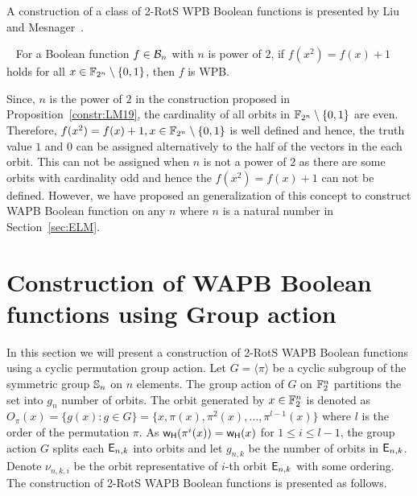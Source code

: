 \documentclass{llncs}
\begin{document}
A construction of a class of 2-RotS WPB Boolean functions is presented by Liu and Mesnager~\cite{DCC:LiuMes19}.
\begin{proposition} \cite{DCC:LiuMes19}~\label{constr:LM19} For a Boolean function $f \in \mathcal{B}_n$ with $n$ is power of $2$, if $f(x^2)=f(x)+1$ holds for all $x \in \mathbb{F}_{2^n} \setminus \{0,1\}$, then $f$ is WPB.  
\end{proposition}
Since, $n$ is the power of $2$ in the construction proposed in Proposition~\ref{constr:LM19}, the cardinality of all orbits in $\mathbb{F}_{2^n} \setminus \{0,1\}$ are even. Therefore, $f(x^2)=f(x)+1, x \in \mathbb{F}_{2^n} \setminus \{0,1\}$ is well defined and hence, the truth value $1$ and $0$ can be assigned alternatively to the half of the vectors in the each orbit. This can not be assigned when $n$ is not a power of $2$ as there are some orbits with cardinality odd and hence the $f(x^2) = f(x)+1$ can not be defined. However, we have proposed an generalization of this concept to construct WAPB Boolean function on any $n$ where $n$ is a natural number in Section~\ref{sec:ELM}. 

\section{Construction of WAPB Boolean functions using Group action}\label{sec:GA}
In this section we will present a construction of 2-RotS WAPB Boolean functions using a cyclic permutation group action. Let $G = \langle \pi \rangle$ be a cyclic subgroup of the symmetric group $\mathbb{S}_n$ on $n$ elements. The group action of $G$ on $\mathbb{F}_2^n$ partitions the set into $g_n$ number of orbits. The orbit generated by $x \in \mathbb{F}_2^n$ is denoted as $O_\pi(x) = \{g(x) : g \in G\} = \{x , \pi(x), \pi^2 (x),\ldots ,\pi^{l-1}(x)\}$ where $l$ is the order of the permutation $\pi$. As $\mathsf{w_H}(\pi^{i}(x)) = \mathsf{w_H}(x)$ for $1 \leq i \leq {l-1}$, the group action $G$ splits each $\mathsf{E}_{n,k}$ into orbits and let $g_{n,k}$ be the number of orbits in $\mathsf{E}_{n,k}$.
Denote $\nu_{n,k,i}$ be the orbit representative of $i$-th orbit $\mathsf{E}_{n,k}$ with some ordering.
The construction of 2-RotS WAPB Boolean functions is presented as follows.
\end{document}
